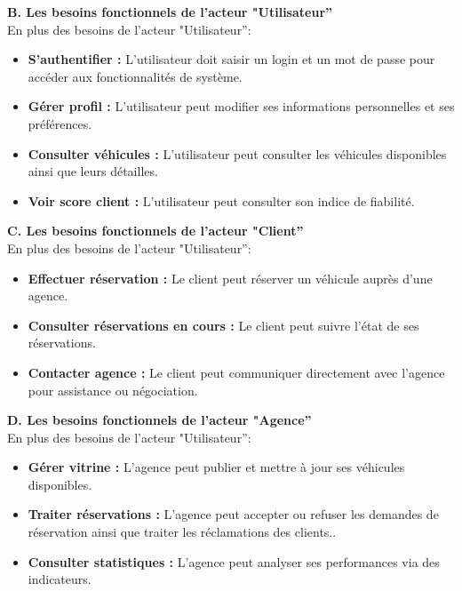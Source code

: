 \textbf{B. Les besoins fonctionnels de l'acteur "Utilisateur''}\\
\hspace*{0.8cm}En plus des besoins de l’acteur "Utilisateur'':
\begin{itemize}
    \item \textbf{S'authentifier :} L'utilisateur doit saisir un login et un mot de 
    passe pour accéder aux fonctionnalités de système.
    \item \textbf{Gérer profil :} L'utilisateur peut modifier ses informations 
    personnelles et ses préférences.
    \item \textbf{Consulter véhicules :} L'utilisateur peut consulter les 
    véhicules disponibles ainsi que leurs détailles.
    \item \textbf{Voir score client :} L'utilisateur peut consulter son indice de 
    fiabilité.
\end{itemize}

\textbf{C. Les besoins fonctionnels de l'acteur "Client''}\\
\hspace*{0.8cm}En plus des besoins de l’acteur "Utilisateur'':
\begin{itemize}
    \item \textbf{Effectuer réservation :} Le client peut réserver un véhicule 
    auprès d'une agence.
    \item \textbf{Consulter réservations en cours :} Le client peut suivre l'état 
    de ses réservations.
    \item \textbf{Contacter agence :} Le client peut communiquer directement avec 
    l'agence pour assistance ou négociation.
\end{itemize}

\textbf{D. Les besoins fonctionnels de l'acteur "Agence''}\\
\hspace*{0.8cm}En plus des besoins de l’acteur "Utilisateur'':
\begin{itemize}
    \item \textbf{Gérer vitrine :} L'agence peut publier et mettre à jour ses 
    véhicules disponibles.
    \item \textbf{Traiter réservations :} L'agence peut accepter ou refuser les 
    demandes de réservation ainsi que traiter les réclamations des clients..
    \item \textbf{Consulter statistiques :} L'agence peut analyser ses performances via des indicateurs.
\end{itemize}

